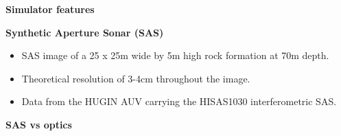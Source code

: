 \documentclass[
    beamer                                       %
  ,table,dvipsnames,svgnames
]{common/mytemplate}
\begin{document}
\renewcommand{\frametitle}[2]{{\vspace*{10pt}\bf\Large #1\par}}


\begin{frame}
\frametitle{Simulator features}
\framesubtitle{}
\begin{figure}[H]
\begin{narrow}{-0.6cm}{-0.6cm}
\end{narrow}
\end{figure}                                                                                                                                                                                                                                                                                                   
\end{frame}


\begin{frame}
\frametitle{\hspace{-.5cm}Synthetic Aperture Sonar (SAS)}
\framesubtitle{}
\vspace{-10pt}
\begin{figure}[H]
\begin{narrow}{.1cm}{-0.6cm}
\flushright\hspace{-10pt}
\end{narrow}
\end{figure}
\vspace{-10pt}
\begin{narrow}{-0.5cm}{-0.5cm}
\begin{itemize}\small
\item SAS image of a 25 x 25m wide by 5m high rock formation at 70m depth.
\item Theoretical resolution of 3-4cm throughout the image.
\item Data from the HUGIN AUV carrying the HISAS1030 interferometric SAS.
\end{itemize}
\end{narrow}
\end{frame}

{
%
\begin{frame}
\frametitle{SAS vs optics}
\framesubtitle{}
\vspace{8cm}
\end{frame}
}
\end{document}
